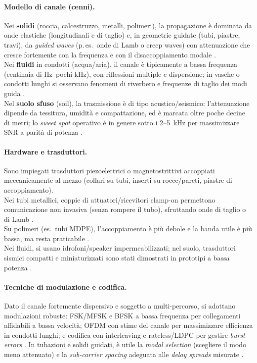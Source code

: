 \paragraph{Modello di canale (cenni).}
Nei \textbf{solidi} (roccia, calcestruzzo, metalli, polimeri), la propagazione è dominata da onde elastiche (longitudinali e di taglio) e, in geometrie guidate 
(tubi, piastre, travi), da \emph{guided waves} (p.\,es.\ onde di Lamb o creep waves) con attenuazione che cresce fortemente con la frequenza e 
con il disaccoppiamento modale \cite{heifetz2020shear}.\\ Nei \textbf{fluidi} in condotti (acqua/aria), il canale è tipicamente 
a bassa frequenza (centinaia di Hz–pochi kHz), con riflessioni multiple e dispersione; in vasche o condotti lunghi si osservano fenomeni di riverbero 
e frequenze di taglio dei modi guida \cite{fishta2023inpipe}. \\Nel \textbf{suolo sfuso} (soil), la trasmissione è di tipo acustico/seismico: 
l’attenuazione dipende da tessitura, umidità e compattazione, ed è marcata oltre poche decine di metri; lo \emph{sweet spot} operativo è in genere 
sotto i 2–5~kHz per massimizzare SNR a parità di potenza \cite{yang2020soil,raza2020wuc}.

\paragraph{Hardware e trasduttori.}
Sono impiegati trasduttori piezoelettrici o magnetostrittivi accoppiati meccanicamente al mezzo (collari su tubi, inserti su rocce/pareti, piastre di accoppiamento).\\
 Nei tubi metallici, coppie di attuatori/ricevitori clamp-on permettono comunicazione non invasiva (senza rompere il tubo), sfruttando onde di taglio o di Lamb \cite{heifetz2017pipes,heifetz2020shear}.\\
  Su polimeri (es.\ tubi MDPE), l’accoppiamento è più debole e la banda utile è più bassa, ma resta praticabile \cite{farai2023mdpe}. \\
  Nei fluidi, si usano idrofoni/speaker impermeabilizzati; nel suolo, trasduttori sismici compatti e miniaturizzati sono stati dimostrati in prototipi a bassa potenza \cite{yang2020soil}.

\paragraph{Tecniche di modulazione e codifica.}
Dato il canale fortemente dispersivo e soggetto a multi-percorso, si adottano modulazioni robuste:
FSK/MFSK e BFSK a bassa frequenza per collegamenti affidabili a bassa velocità; OFDM con stime del canale per massimizzare efficienza in condotti lunghi; e codifica con interleaving e rateless/LDPC per gestire \emph{burst errors} \cite{fishta2023inpipe,farai2023mdpe}. In tubazioni e solidi guidati, è utile la \emph{modal selection} (scegliere il modo meno attenuato) e la \emph{sub-carrier spacing} adeguata alle \emph{delay spreads} misurate \cite{heifetz2020shear,farai2023mdpe}.

